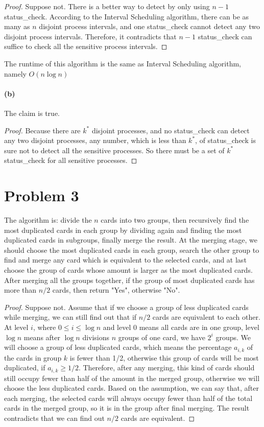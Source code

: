 \documentclass[letter,12pt]{article}
\begin{document}
\begin{proof}
Suppose not. There is a better way to detect by only using $n-1$ 
\textsf{status\_check}. According to the Interval Scheduling algorithm,
there can be as many as $n$ disjoint process intervals, and one 
\textsf{status\_check} cannot detect any two disjoint process intervals.
Therefore, it contradicts that $n-1$ \textsf{status\_check} can suffice 
to check all the sensitive process intervals.
\end{proof}

The runtime of this algorithm is the same as Interval Scheduling 
algorithm, namely $O(n\log n)$

\paragraph*{(b)}
The claim is true.
\begin{proof}
Because there are $k^*$ disjoint processes, and no 
\textsf{status\_check} can detect any two disjoint processes, any
number, which is less than $k^*$, of \textsf{status\_check} is sure
not to detect all the sensitive processes. So there must be a set of
$k^*$ \textsf{status\_check} for all sensitive processes.
\end{proof}

\section*{Problem 3}
The algorithm is: divide the $n$ cards into two groups, then recursively 
find the most duplicated cards in each group by dividing again and 
finding the most duplicated cards in subgroups, finally merge the result.
At the merging stage, we should choose the most duplicated cards in 
each group, search the other group to find and merge any card which is 
equivalent to the selected cards, and at last choose the group of cards 
whose amount is larger as the most duplicated cards. After merging
all the groups together, if the group of most duplicated cards has 
more than $n/2$ cards, then return "Yes", otherwise "No".

\begin{proof}
Suppose not. Assume that if we choose a group of less duplicated cards
while merging, we can still find out that if $n/2$ cards are equivalent 
to each other. At level $i$, where $0 \le i \le \log n$ and level 0 means
all cards are in one group, level $\log n$ means after $\log n$ divisions
$n$ groups of one card, we have $2^i$ groups. We will choose a 
group of less duplicated cards, which means the percentage $a_{i,k}$ of 
the cards in group $k$ is fewer than 1/2, otherwise this group of cards
will be most duplicated, if $a_{i,k} \geq 1/2$. Therefore, after any 
merging, this kind of cards should still occupy fewer than half of the 
amount in the merged group, otherwise we will choose the less 
duplicated cards. Based on the assumption, we can say that, after each
merging, the selected cards will always occupy fewer than half of the
total cards in the merged group, so it is in the group after final merging.
The result contradicts that we can find out $n/2$ cards are equivalent.
\end{proof}
\end{document}
